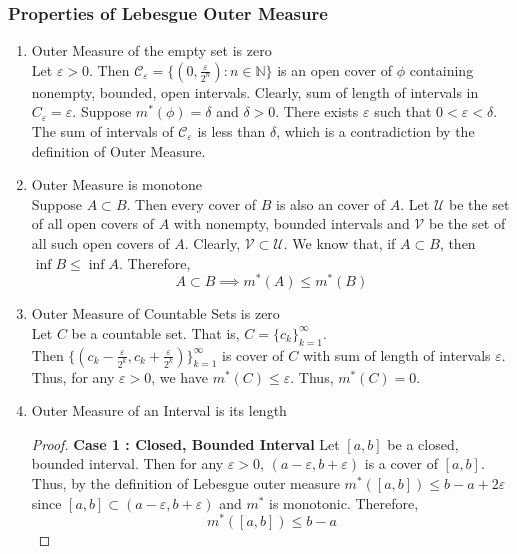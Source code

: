 \subsubsection{Properties of Lebesgue Outer Measure}
\begin{enumerate}
	\item Outer Measure of the empty set is zero\\
	Let $\varepsilon > 0$.
	Then $\mathcal{C}_\varepsilon = \{ (0,\frac{\varepsilon}{2^n}) : n \in \mathbb{N} \}$ is an open cover of $\phi$ containing nonempty, bounded, open intervals.
	Clearly, sum of length of intervals in $C_\varepsilon = \varepsilon$.
	Suppose $m^\ast(\phi) = \delta$ and $\delta > 0$.
	There exists $\varepsilon$ such that $0 < \varepsilon < \delta$.
	The sum of intervals of $\mathcal{C}_\varepsilon$ is less than $\delta$, which is a contradiction by the definition of Outer Measure.
	\item Outer Measure is monotone\\
	Suppose $A \subset B$.
	Then every cover of $B$ is also an  cover of $A$.
	Let $\mathcal{U}$ be the set of all open covers of $A$ with nonempty, bounded intervals and $\mathcal{V}$ be the set of all such open covers of $A$.
	Clearly, $\mathcal{V} \subset \mathcal{U}$.
	We know that, if $A \subset B$, then $\inf{B} \le \inf{A}$.
	Therefore,
	\begin{equation}
		A \subset B \implies m^\ast(A) \le m^\ast(B)
	\end{equation}
	\item Outer Measure of Countable Sets is zero\\
	Let $C$ be a countable set.
	That is, $C = \{ c_k \}_{k=1}^\infty$.\\
	Then $\{ (c_k-\frac{\varepsilon}{2^k}, c_k + \frac{\varepsilon}{2^k}) \}_{k=1}^\infty$ is cover of $C$ with sum of length of intervals $\varepsilon$.
	Thus, for any $\varepsilon > 0$, we have $m^\ast(C) \le \varepsilon$.
	Thus, $m^\ast(C) = 0$.
	\item Outer Measure of an Interval is its length
	\begin{proof}
		\textbf{Case 1 : Closed, Bounded Interval}
		Let $[a,b]$ be a closed, bounded interval.
		Then for any $\varepsilon > 0$, $(a-\varepsilon,b+\varepsilon)$ is a cover of $[a,b]$.
		Thus, by the definition of Lebesgue outer measure $m^\ast([a,b]) \le b-a+2\varepsilon$ since $[a,b] \subset (a-\varepsilon,b+\varepsilon)$ and $m^\ast$ is monotonic.
		Therefore,
	\begin{equation}
		m^\ast([a,b]) \le b-a
	\end{equation}


\end{proof}
\end{enumerate}
